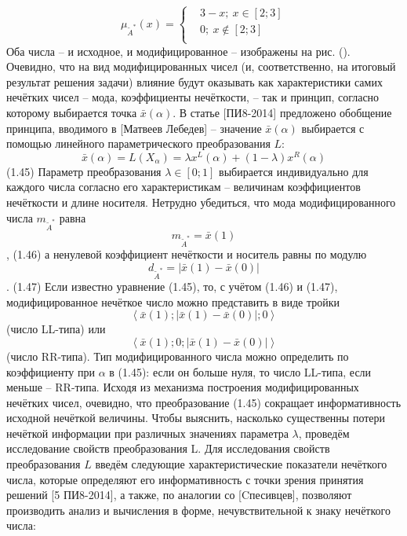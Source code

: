 	\[{{\mu }_{{{{\tilde{A}}}^{*}}}}\left( x \right)=\left\{ \begin{aligned}
  & 3-x;\ x\in \left[ 2;3 \right] \\ 
 & 0;\ x\notin \left[ 2;3 \right] \\ 
\end{aligned} \right.\] 
Оба числа – и исходное, и модифицированное – изображены на рис. ().
Очевидно, что на вид модифицированных чисел (и, соответственно, на итоговый результат решения задачи) влияние будут оказывать как характеристики самих нечётких чисел – мода, коэффициенты нечёткости, – так и принцип, согласно которому выбирается точка $\bar{x}\left( \alpha  \right)$. В статье [ПИ8-2014] предложено обобщение принципа, вводимого в [Матвеев Лебедев] – значение $\bar{x}\left( \alpha  \right)$ выбирается с помощью линейного параметрического преобразования $L$:
	\[\bar{x}\left( \alpha  \right)=L\left( {{X}_{\alpha }} \right)=\lambda {{x}^{L}}\left( \alpha  \right)+\left( 1-\lambda  \right){{x}^{R}}\left( \alpha  \right)\] 	(1.45)
Параметр преобразования $\lambda \in \left[ 0;1 \right]$ выбирается индивидуально для каждого числа согласно его характеристикам – величинам коэффициентов нечёткости и длине носителя. Нетрудно убедиться, что мода модифицированного числа ${{m}_{{{{\tilde{A}}}^{*}}}}$ равна
	\[{{m}_{{{{\tilde{A}}}^{*}}}}=\bar{x}\left( 1 \right)\],	(1.46)
а ненулевой коэффициент нечёткости и носитель равны по модулю
	\[{{d}_{{{{\tilde{A}}}^{*}}}}=\left| \bar{x}\left( 1 \right)-\bar{x}\left( 0 \right) \right|\].	(1.47)
Если известно уравнение (1.45), то, с учётом (1.46) и (1.47), модифицированное нечёткое число можно представить в виде тройки \[\left\langle \bar{x}\left( 1 \right);\left| \bar{x}\left( 1 \right)-\bar{x}\left( 0 \right) \right|;0 \right\rangle \] (число LL-типа) или \[\left\langle \bar{x}\left( 1 \right);0;\left| \bar{x}\left( 1 \right)-\bar{x}\left( 0 \right) \right| \right\rangle \] (число RR-типа). Тип модифицированного числа можно определить по коэффициенту при $\alpha $ в (1.45): если он больше нуля, то число LL-типа, если меньше – RR-типа.
Исходя из механизма построения модифицированных нечётких чисел, очевидно, что преобразование (1.45) сокращает информативность исходной нечёткой величины. Чтобы выяснить, насколько существенны потери нечёткой информации при различных значениях параметра $\lambda $, проведём исследование свойств преобразования L.
Для исследования свойств преобразования $L$ введём следующие характеристические показатели нечёткого числа, которые определяют его информативность с точки зрения принятия решений [5 ПИ8-2014], а также, по аналогии со [Cпесивцев], позволяют производить анализ и вычисления в форме, нечувствительной к знаку нечёткого числа:
